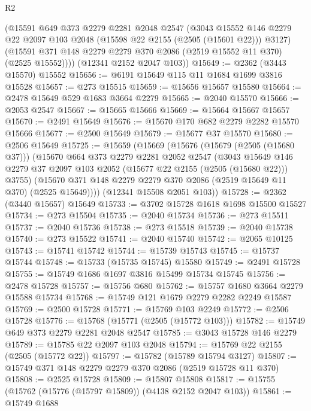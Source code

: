 \begin{lexlean}{R2}
\begin{coremodule}
        (@15591
          @649
          @373
          @2279
          @2281
          @2048
          @2547
          (@3043
            @15552
            @146
            @2279
            @22
            @2097
            @103
            @2048
            (@15598 @22 @2155 (@2505 (@15601 @22)))
            @3127)
          (@15591 @371 @148 @2279 @2279 @370 @2086 (@2519 @15552 @11 @370) (@2525 @15552))))
      (@12341 @2152 @2047 @103))
@15649 := @2362 (@3443 @15570) @15552
@15656 := @6191 @15649 @115 @11 @1684 @1699 @3816 @15528
@15657 := @273 @15515
@15659 := @15656 @15657 @15580
@15664 := @2478 @15649 @529 @1683 @3664 @2279
@15665 := @2040 @15570
@15666 := @2053 @2547
@15667 := @15665 @15666
@15669 := @15664 @15667 @15657
@15670 := @2491 @15649
@15676 := @15670 @170 @682 @2279 @2282 @15570 @15666
@15677 := @2500 @15649
@15679 := @15677 @37 @15570
@15680 := @2506 @15649
@15725 := @15659
    (@15669
      (@15676
        (@15679 (@2505 (@15680 @37)))
        (@15670
          @664
          @373
          @2279
          @2281
          @2052
          @2547
          (@3043
            @15649
            @146
            @2279
            @37
            @2097
            @103
            @2052
            (@15677 @22 @2155 (@2505 (@15680 @22)))
            @3755)
          (@15670 @371 @148 @2279 @2279 @370 @2086 (@2519 @15649 @11 @370) (@2525 @15649))))
      (@12341 @15508 @2051 @103))
@15728 := @2362 (@3440 @15657) @15649
@15733 := @3702 @15728 @1618 @1698 @15500 @15527
@15734 := @273 @15504
@15735 := @2040 @15734
@15736 := @273 @15511
@15737 := @2040 @15736
@15738 := @273 @15518
@15739 := @2040 @15738
@15740 := @273 @15522
@15741 := @2040 @15740
@15742 := @2065 @10125
@15743 := @15741 @15742
@15744 := @15739 @15743
@15745 := @15737 @15744
@15748 := @15733 (@15735 @15745) @15580
@15749 := @2491 @15728
@15755 := @15749 @1686 @1697 @3816 @15499 @15734 @15745
@15756 := @2478 @15728
@15757 := @15756 @680
@15762 := @15757 @1680 @3664 @2279 @15588 @15734
@15768 := @15749 @121 @1679 @2279 @2282 @2249 @15587
@15769 := @2500 @15728
@15771 := @15769 @103 @2249
@15772 := @2506 @15728
@15776 := @15768 (@15771 (@2505 (@15772 @103)))
@15782 := @15749 @649 @373 @2279 @2281 @2048 @2547
@15785 := @3043 @15728 @146 @2279
@15789 := @15785 @22 @2097 @103 @2048
@15794 := @15769 @22 @2155 (@2505 (@15772 @22))
@15797 := @15782 (@15789 @15794 @3127)
@15807 := @15749 @371 @148 @2279 @2279 @370 @2086 (@2519 @15728 @11 @370)
@15808 := @2525 @15728
@15809 := @15807 @15808
@15817 := @15755 (@15762 (@15776 (@15797 @15809)) (@4138 @2152 @2047 @103))
@15861 := @15749
    @1688

\end{coremodule}
\end{lexlean}
